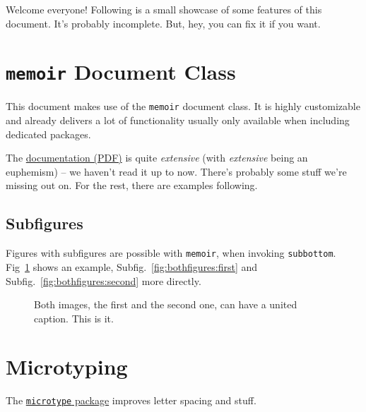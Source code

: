 
Welcome everyone! Following is a small showcase of some features of this document. It's probably incomplete. But, hey, you can fix it if you want.

\section{\texttt{memoir} Document Class} %
\label{sec:memoir_document_class}
This document makes use of the \texttt{memoir} document class. It is highly customizable and already delivers a lot of functionality usually only available when including dedicated packages.

The \href{http://www.tex.ac.uk/ctan/macros/latex/contrib/memoir/memman.pdf}{documentation (PDF)} is quite \emph{extensive} (with \emph{extensive} being an euphemism) -- we haven't read it up to now. There's probably some stuff we're missing out on. For the rest, there are examples following.

\subsection{Subfigures} %
Figures with subfigures are possible with \texttt{memoir}, when invoking \verb|subbottom|. Fig~\ref{fig:bothfigures} shows an example, Subfig.~\ref{fig:bothfigures:first} and Subfig.~\ref{fig:bothfigures:second} more directly.
\label{sub:subfigures}
\begin{figure}[h!]
	\centering
	\caption{\label{fig:bothfigures}Both images, the first and the second one, can have a united caption. This is it.}
\end{figure}

\section{Microtyping} %
\label{sec:microtyping}
The \href{http://ctan.org/pkg/microtype}{\texttt{microtype} package} improves letter spacing and stuff.

